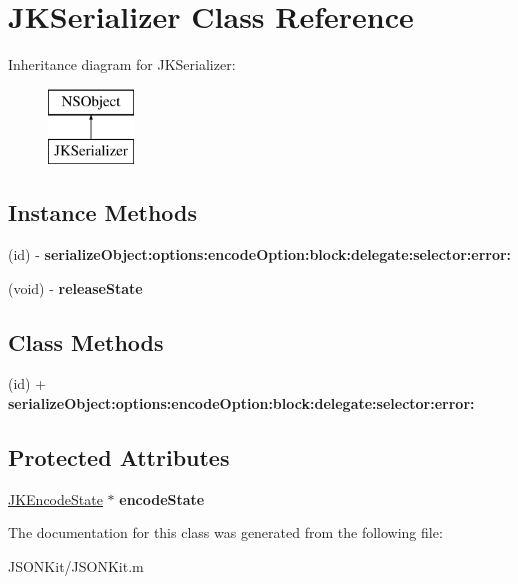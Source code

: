 \hypertarget{interface_j_k_serializer}{\section{J\+K\+Serializer Class Reference}
\label{interface_j_k_serializer}
}
Inheritance diagram for J\+K\+Serializer\+:\begin{figure}[H]
\begin{center}
\leavevmode
\includegraphics[height=2.000000cm]{interface_j_k_serializer}
\end{center}
\end{figure}
\subsection*{Instance Methods}
\begin{DoxyCompactItemize}
\item 
\hypertarget{interface_j_k_serializer_a87382a040de01c2a3b87c2bec27b8045}{(id) -\/ {\bfseries serialize\+Object\+:options\+:encode\+Option\+:block\+:delegate\+:selector\+:error\+:}}\label{interface_j_k_serializer_a87382a040de01c2a3b87c2bec27b8045}

\item 
\hypertarget{interface_j_k_serializer_a1149913af74980381131cdccf0da8545}{(void) -\/ {\bfseries release\+State}}\label{interface_j_k_serializer_a1149913af74980381131cdccf0da8545}

\end{DoxyCompactItemize}
\subsection*{Class Methods}
\begin{DoxyCompactItemize}
\item 
\hypertarget{interface_j_k_serializer_a87382a040de01c2a3b87c2bec27b8045}{(id) + {\bfseries serialize\+Object\+:options\+:encode\+Option\+:block\+:delegate\+:selector\+:error\+:}}\label{interface_j_k_serializer_a87382a040de01c2a3b87c2bec27b8045}

\end{DoxyCompactItemize}
\subsection*{Protected Attributes}
\begin{DoxyCompactItemize}
\item 
\hypertarget{interface_j_k_serializer_a194502e1f78000add993592a219b5fd7}{\hyperlink{struct_j_k_encode_state}{J\+K\+Encode\+State} $\ast$ {\bfseries encode\+State}}\label{interface_j_k_serializer_a194502e1f78000add993592a219b5fd7}

\end{DoxyCompactItemize}


The documentation for this class was generated from the following file\+:\begin{DoxyCompactItemize}
\item 
J\+S\+O\+N\+Kit/J\+S\+O\+N\+Kit.\+m\end{DoxyCompactItemize}
